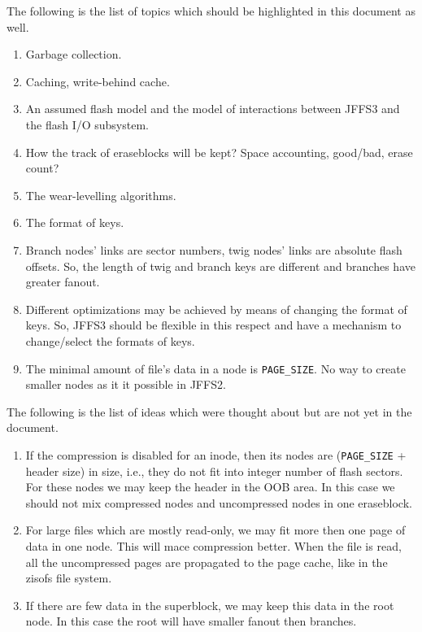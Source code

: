 \documentclass[12pt,a4paper,oneside,titlepage]{article}
\begin{document}
The following is the list of topics which should be highlighted in this document
as well.

\begin{enumerate}

\item Garbage collection.

\item Caching, write-behind cache.

\item An assumed flash model and the model of interactions between JFFS3 and
the flash I/O subsystem.

\item How the track of eraseblocks will be kept? Space accounting, good/bad,
erase count?

\item The wear-levelling algorithms.

\item The format of keys.

\item Branch nodes' links are sector numbers, twig nodes' links are absolute
flash offsets. So, the length of twig and branch keys are different and
branches have greater fanout.

\item Different optimizations may be achieved by means of changing the format
of keys. So, JFFS3 should be flexible in this respect and have a mechanism to
change/select the formats of keys.

\item The minimal amount of file's data in a node is \texttt{PAGE\_SIZE}. No
way to create smaller nodes as it it possible in JFFS2.

\end{enumerate}

The following is the list of ideas which were thought about but are not yet in
the document.

\begin{enumerate}

\item If the compression is disabled for an inode, then its nodes are
(\texttt{PAGE\_SIZE} + header size) in size, i.e., they do not fit into integer
number of flash sectors. For these nodes we may keep the header in the OOB
area. In this case we should not mix compressed nodes and uncompressed nodes in
one eraseblock.

\item For large files which are mostly read-only, we may fit more then one page
of data in one node. This will mace compression better. When the file is read,
all the uncompressed pages are propagated to the page cache, like in the zisofs
file system.

\item If there are few data in the superblock, we may keep this data in the
root node. In this case the root will have smaller fanout then branches.

\end{enumerate}
\end{document}
